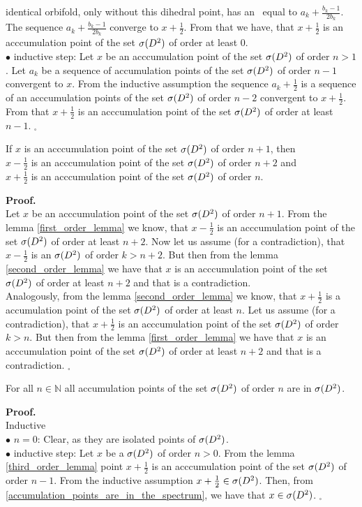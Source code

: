 identical orbifold, only without this dihedral point, has an \Eoc\ equal to $a_k + 
\frac{b_k-1}{2b_k}$. 
The sequence $a_k + \frac{b_k-1}{2b_k}$ converge to $x+\frac{1}{2}$. From that we have, that 
$x + \frac{1}{2}$ is an acccumulation point of the set ${{\sigma}(D^2)}$ of order at least $0$. \\
$\bullet$ inductive step: Let $x$ be an acccumulation point of the set ${{\sigma}(D^2)}$ of order $n > 1$. 
Let $a_k$ be a sequence of accumulation points of the set ${{\sigma}(D^2)}$ of order $n-1$ 
convergent to $x$. 
From the inductive assumption the sequence $a_k + \frac{1}{2}$ is a sequence of an acccumulation
 points of the set ${{\sigma}(D^2)}$ of order $n-2$ convergent to $x + \frac{1}{2}$. From that 
 $x + \frac{1}{2}$ is an acccumulation point of the set ${{\sigma}(D^2)}$ of order at least 
 $n-1$. $_\square$ 
\begin{lemma}\label{third_order_lemma}
If $x$ is an acccumulation point of the set ${{\sigma}(D^2)}$ of order $n+1$, then \\
$x - \frac{1}{2}$ is an acccumulation point of the set ${{\sigma}(D^2)}$ of order $n+2$ and \\
$x + \frac{1}{2}$ is an acccumulation point of the set ${{\sigma}(D^2)}$ of order $n$. 
\end{lemma}
\noindent\textbf{Proof.} \\
Let $x$ be an acccumulation point of the set ${{\sigma}(D^2)}$ of order $n+1$. From the lemma 
 \ref{first_order_lemma} we know, that $x - \frac{1}{2}$ is an acccumulation point of the set 
 ${{\sigma}(D^2)}$ of order at least $n+2$. Now let us assume (for a contradiction), that $x - \frac{1}{2}$ 
 is an \apots ${{\sigma}(D^2)}$ of order $k>n+2$. But then from the lemma \ref{second_order_lemma} 
 we have that $x$ is an acccumulation point of the set ${{\sigma}(D^2)}$ of order at least $n+2$ and that 
 is a contradiction. \\
Analogously, from the lemma \ref{second_order_lemma} we know, that $x + \frac{1}{2}$ is a 
accumulation point of the set ${{\sigma}(D^2)}$ of order at least $n$. Let us assume (for a contradiction), 
that $x+ \frac{1}{2}$ is an acccumulation point of the set ${{\sigma}(D^2)}$ of order $k>n$. But then 
from the lemma \ref{first_order_lemma} we have that $x$ is an acccumulation point of 
the set ${{\sigma}(D^2)}$ 
of order at least $n+2$ and that is a contradiction. $_\square$ 
\begin{lemma}\label{accumulation_points_of_the_set}
For all $n \in \mathbb{N}$ all accumulation points of the set ${{\sigma}(D^2)}$ of order $n$ are in ${{\sigma}(D^2)}$.
\end{lemma}
\noindent\textbf{Proof.} \\
Inductive \\
$\bullet$ $n=0$: Clear, as they are isolated points of ${{\sigma}(D^2)}$. \\
$\bullet$ inductive step: Let $x$ be a \apots  ${{\sigma}(D^2)}$ of order $n>0$. From the lemma 
\ref{third_order_lemma} point $x+\frac{1}{2}$ is an acccumulation point of the set ${{\sigma}(D^2)}$  
of order $n-1$. From the inductive assumption $x+\frac{1}{2} \in {{\sigma}(D^2)}$. Then, 
from \ref{accumulation_points_are_in_the_spectrum}, we have that $x \in {{\sigma}(D^2)}$. 
$_\square$ 

